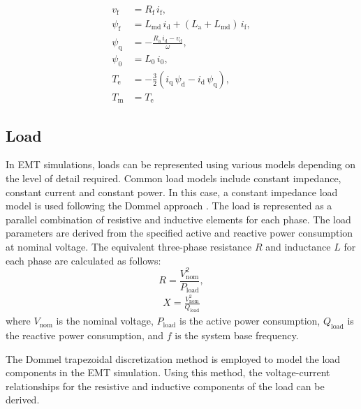 \begin{enumerate}
\begin{equation}
\begin{aligned}
    v_{\text{f}} &= R_{\text{f}}\, i_{\text{f}}, \\[6pt]
    \psi_{\text{f}} &= L_{\text{md}}\, i_{\text{d}} + (L_{\text{a}} + L_{\text{md}})\, i_{\text{f}}, \\[6pt]
    \psi_{\text{q}} &= -\frac{R_{\text{a}}\, i_{\text{d}} - v_{\text{d}}}{\omega}, \\[6pt]
    \psi_{\text{0}} &= L_{\text{0}}\, i_{\text{0}}, \\[6pt]
    T_{\text{e}} &= -\frac{3}{2}\left(i_{\text{q}}\,\psi_{\text{d}} - i_{\text{d}}\,\psi_{\text{q}}\right), \\[6pt]
    T_{\text{m}} &= T_{\text{e}}
\end{aligned}
\end{equation}

\end{enumerate}

\subsection{Load}

In EMT simulations, loads can be represented using various models depending on the level of detail required. Common load models include constant impedance, constant current and constant power. 
In this case, a constant impedance load model is used following the Dommel approach \cite{Dommel_EMTP_Theory_Book_1986}. The load is represented as a parallel combination of resistive and inductive elements for each phase.
The load parameters are derived from the specified active and reactive power consumption at nominal voltage. The equivalent three-phase resistance $R$ and inductance $L$ for each phase are calculated as follows:
\begin{equation}
    R = \frac{V_\text{nom}^2}{P_\text{load}},
\end{equation}
\begin{equation}
\begin{aligned}
    X = \frac{V_\text{nom}^2}{Q_\text{load}}
\end{aligned}  
\end{equation}
where $V_\text{nom}$ is the nominal voltage, $P_\text{load}$ is the active power consumption, $Q_\text{load}$ is the reactive power consumption, and $f$ is the system base frequency. 

The Dommel trapezoidal discretization method is employed to model the load components in the EMT simulation.
Using this method, the voltage-current relationships for the resistive and inductive components of the load can be derived.

